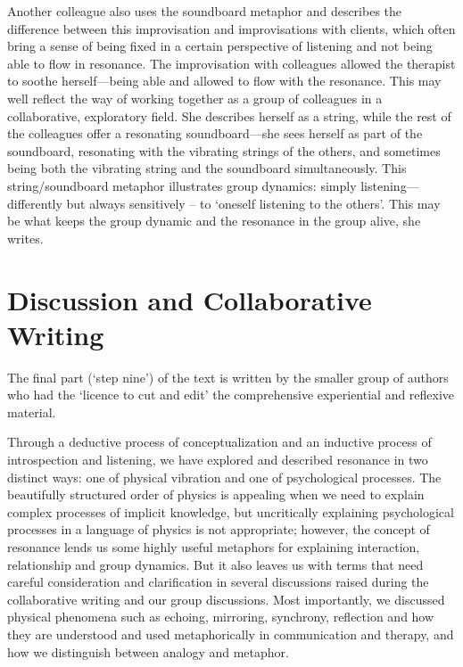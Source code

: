 \begin{adjmulticols}{2}{0mm}{0mm}
Another colleague also uses the soundboard metaphor and describes the difference between this improvisation and improvisations with clients, which often bring a sense of being fixed in a certain perspective of listening and not being able to flow in resonance. The improvisation with colleagues allowed the therapist to soothe herself—being able and allowed to flow with the resonance. This may well reflect the way of working together as a group of colleagues in a collaborative, exploratory field. She describes herself as a string, while the rest of the colleagues offer a resonating soundboard—she sees herself as part of the soundboard, resonating with the vibrating strings of the others, and sometimes being both the vibrating string and the soundboard simultaneously. This string/soundboard metaphor illustrates group dynamics: simply listening—differently but always sensitively – to ‘oneself listening to the others’. This may be what keeps the group dynamic and the resonance in the group alive, she writes.

\chapter{Discussion and Collaborative Writing}
The final part (‘step nine’) of the text is written by the smaller group of authors who had the ‘licence to cut and edit’ the comprehensive experiential and reflexive material. 

Through a deductive process of conceptualization and an inductive process of introspection and listening, we have explored and described resonance in two distinct ways: one of physical vibration and one of psychological processes. The beautifully structured order of physics is appealing when we need to explain complex processes of implicit knowledge, but uncritically explaining psychological processes in a language of physics is not appropriate; however, the concept of resonance lends us some highly useful metaphors for explaining interaction, relationship and group dynamics. But it also leaves us with terms that need careful consideration and clarification in several discussions raised during the collaborative writing and our group discussions. Most importantly, we discussed physical phenomena such as echoing, mirroring, synchrony, reflection and how they are understood and used metaphorically in communication and therapy, and how we distinguish between analogy and metaphor. 


\end{adjmulticols}

